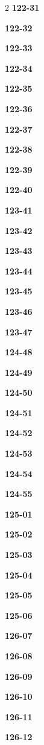 \documentclass[10pt,a4paper]{article}
\begin{document}
\begin{multicols}{2}
\noindent\textbf{122-31}\ \par
\noindent\textbf{122-32}\ \par
\noindent\textbf{122-33}\ \par
\noindent\textbf{122-34}\ \par
\noindent\textbf{122-35}\ \par
\noindent\textbf{122-36}\ \par
\noindent\textbf{122-37}\ \par
\noindent\textbf{122-38}\ \par
\noindent\textbf{122-39}\ \par
\noindent\textbf{122-40}\ \par
\noindent\textbf{123-41}\ \par
\noindent\textbf{123-42}\ \par
\noindent\textbf{123-43}\ \par
\noindent\textbf{123-44}\ \par
\noindent\textbf{123-45}\ \par
\noindent\textbf{123-46}\ \par
\noindent\textbf{123-47}\ \par
\noindent\textbf{124-48}\ \par
\noindent\textbf{124-49}\ \par
\noindent\textbf{124-50}\ \par
\noindent\textbf{124-51}\ \par
\noindent\textbf{124-52}\ \par
\noindent\textbf{124-53}\ \par
\noindent\textbf{124-54}\ \par
\noindent\textbf{124-55}\ \par
\noindent\textbf{125-01}\ \par
\noindent\textbf{125-02}\ \par
\noindent\textbf{125-03}\ \par
\noindent\textbf{125-04}\ \par
\noindent\textbf{125-05}\ \par
\noindent\textbf{125-06}\ \par
\noindent\textbf{126-07}\ \par
\noindent\textbf{126-08}\ \par
\noindent\textbf{126-09}\ \par
\noindent\textbf{126-10}\ \par
\noindent\textbf{126-11}\ \par
\noindent\textbf{126-12}\ \par

\end{multicols}
\end{document}

